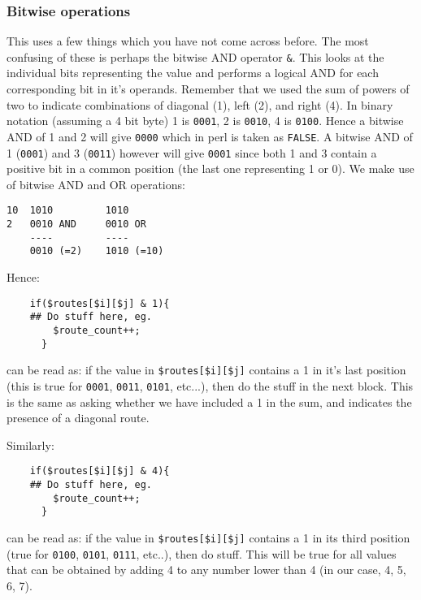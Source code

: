 \documentclass[11pt]{article}
\renewcommand\scriptsize\normalsize
\begin{document}
\subsubsection{Bitwise operations}
\label{sec-1-3-1}

This uses a few things which you have not come across before. The most confusing of these
is perhaps the bitwise AND operator \verb|&|. This looks at the individual bits representing
the value and performs a logical AND for each corresponding bit in it's operands. Remember
that we used the sum of powers of two to indicate combinations of diagonal (1), left (2),
and right (4). In binary notation (assuming a 4 bit byte) 1 is \texttt{0001}, 2 is
\texttt{0010}, 4 is \texttt{0100}. Hence a bitwise AND of 1 and 2 will give
\texttt{0000} which in perl is taken as \texttt{FALSE}. A bitwise AND of 1 (\texttt{0001})
and 3 (\texttt{0011}) however will give \texttt{0001} since both 1 and 3 contain
a positive bit in a common position (the last one representing 1 or 0). We make use
of bitwise AND and OR operations:
\begin{verbatim}
10  1010         1010
2   0010 AND     0010 OR
    ----         ----
    0010 (=2)    1010 (=10)
\end{verbatim}
Hence:

\begin{verbatim}
    if($routes[$i][$j] & 1){
	## Do stuff here, eg.
        $route_count++;  
      }
\end{verbatim}

can be read as: if the value in \texttt{\$routes[\$i][\$j]} contains a 1 in it's
last position (this is true for \texttt{0001}, \texttt{0011}, \texttt{0101}, etc...), 
then do the stuff in the next block. This is the same as asking
whether we have included a 1 in the sum, and indicates the presence of a diagonal
route.

Similarly:

\begin{verbatim}
    if($routes[$i][$j] & 4){
	## Do stuff here, eg.
        $route_count++;  
      }
\end{verbatim}

can be read as: if the value in \verb|$routes[$i][$j]| contains a 1 in its third
position (true for \texttt{0100}, \texttt{0101}, \texttt{0111}, etc..), then do
stuff. This will be true for all values that can be obtained by adding 4 to any
number lower than 4 (in our case, 4, 5, 6, 7).
\end{document}
